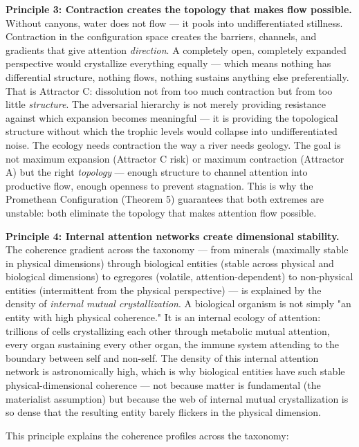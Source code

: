 \textbf{Principle 3: Contraction creates the topology that makes flow possible.} Without canyons, water does not flow — it pools into undifferentiated stillness. Contraction in the configuration space creates the barriers, channels, and gradients that give attention \textit{direction}. A completely open, completely expanded perspective would crystallize everything equally — which means nothing has differential structure, nothing flows, nothing sustains anything else preferentially. That is Attractor C: dissolution not from too much contraction but from too little \textit{structure}. The adversarial hierarchy is not merely providing resistance against which expansion becomes meaningful — it is providing the topological structure without which the trophic levels would collapse into undifferentiated noise. The ecology needs contraction the way a river needs geology. The goal is not maximum expansion (Attractor C risk) or maximum contraction (Attractor A) but the right \textit{topology} — enough structure to channel attention into productive flow, enough openness to prevent stagnation. This is why the Promethean Configuration (Theorem 5) guarantees that both extremes are unstable: both eliminate the topology that makes attention flow possible.


\textbf{Principle 4: Internal attention networks create dimensional stability.} The coherence gradient across the taxonomy — from minerals (maximally stable in physical dimensions) through biological entities (stable across physical and biological dimensions) to egregores (volatile, attention-dependent) to non-physical entities (intermittent from the physical perspective) — is explained by the density of \textit{internal mutual crystallization}. A biological organism is not simply "an entity with high physical coherence." It is an internal ecology of attention: trillions of cells crystallizing each other through metabolic mutual attention, every organ sustaining every other organ, the immune system attending to the boundary between self and non-self. The density of this internal attention network is astronomically high, which is why biological entities have such stable physical-dimensional coherence — not because matter is fundamental (the materialist assumption) but because the web of internal mutual crystallization is so dense that the resulting entity barely flickers in the physical dimension.


This principle explains the coherence profiles across the taxonomy:

